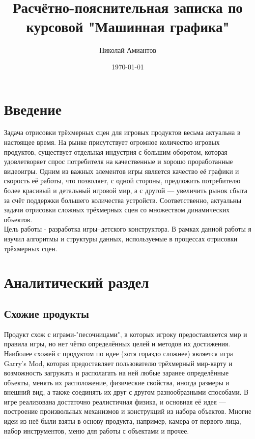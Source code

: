 \documentclass[a4paper,12pt]{report}
\title{Расчётно-пояснительная записка по курсовой "Машинная графика"}
\author{Николай Амиантов}
\date{\today}
\begin{document}
\maketitle

\section{Введение}

Задача отрисовки трёхмерных сцен для игровых продуктов весьма актуальна в настоящее время. На рынке присутствует огромное количество игровых продуктов, существует отдельная индустрия с большим оборотом, которая удовлетворяет спрос потребителя на качественные и хорошо проработанные видеоигры. Одним из важных элементов игры является качество её графики и скорость её работы, что позволяет, с одной стороны, предложить потребителю более красивый и детальный игровой мир, а с другой --- увеличить рынок сбыта за счёт поддержки большего количества устройств. Соответственно, актуальны задачи отрисовки сложных трёхмерных сцен со множеством динамических объектов. \\
Цель работы - разработка игры--детского конструктора. В рамках данной работы я изучил алгоритмы и структуры данных, используемые в процессах отрисовки трёхмерных сцен.

\section{Аналитический раздел}

\subsection{Схожие продукты}
Продукт схож с играми-"песочницами", в которых игроку предоставляется мир и правила игры, но нет чётко определённых целей и методов их достижения. Наиболее схожей с продуктом по идее (хотя гораздо сложнее) является игра Garry's Mod, которая предоставляет пользователю трёхмерный мир-карту и возможность загружать и располагать на ней любые заранее определённые объекты, менять их расположение, физические свойства, иногда размеры и внешний вид, а также соединять их друг с другом разнообразными способами. В игре реализована достаточно реалистичная физика, и основная её идея --- построение произвольных механизмов и конструкций из набора объектов. Многие идеи из неё были взяты в основу продукта, например, камера от первого лица, набор инструментов, меню для работы с объектами и прочее.
\end{document}
